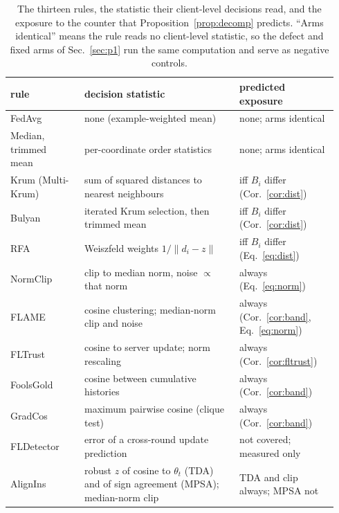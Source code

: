 \documentclass[journal]{IEEEtran}
\begin{document}
\begin{table}[t]
\centering
\caption{The thirteen rules, the statistic their client-level decisions read, and the
exposure to the counter that Proposition~\ref{prop:decomp} predicts. ``Arms
identical'' means the rule reads no client-level statistic, so the defect and
fixed arms of Sec.~\ref{sec:p1} run the same computation and serve as negative
controls.}
\label{tab:rules}
\small
\begin{tabular}{@{}p{0.21\linewidth}p{0.44\linewidth}p{0.29\linewidth}@{}}
\toprule
rule & decision statistic & predicted exposure \\
\midrule
FedAvg~\cite{mcmahan2017} & none (example-weighted mean) & none; arms identical \\
Median, trimmed mean~\cite{yin2018} & per-coordinate order statistics & none; arms identical \\
Krum (Multi-Krum)~\cite{blanchard2017} & sum of squared distances to nearest neighbours & iff $B_i$ differ (Cor.~\ref{cor:dist}) \\
Bulyan~\cite{mhamdi2018bulyan} & iterated Krum selection, then trimmed mean & iff $B_i$ differ (Cor.~\ref{cor:dist}) \\
RFA~\cite{pillutla2022rfa} & Weiszfeld weights $1/\|d_i-z\|$ & iff $B_i$ differ (Eq.~\eqref{eq:dist}) \\
NormClip~\cite{sun2019} & clip to median norm, noise $\propto$ that norm & always (Eq.~\eqref{eq:norm}) \\
FLAME~\cite{nguyen2022flame} & cosine clustering; median-norm clip and noise & always (Cor.~\ref{cor:band}, Eq.~\eqref{eq:norm}) \\
FLTrust~\cite{cao2021fltrust} & cosine to server update; norm rescaling & always (Cor.~\ref{cor:fltrust}) \\
FoolsGold~\cite{fung2020foolsgold} & cosine between cumulative histories & always (Cor.~\ref{cor:band}) \\
GradCos & maximum pairwise cosine (clique test) & always (Cor.~\ref{cor:band}) \\
FLDetector~\cite{zhang2022fldetector} & error of a cross-round update prediction & not covered; measured only \\
AlignIns~\cite{xu2025alignins} & robust $z$ of cosine to $\theta_t$ (TDA) and of sign agreement (MPSA); median-norm clip & TDA and clip always; MPSA not \\
\bottomrule
\end{tabular}
\end{table}
\end{document}
